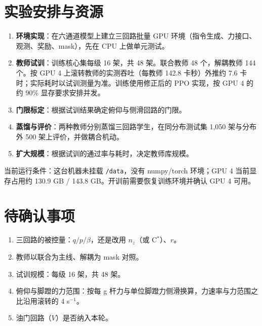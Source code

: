 \documentclass[UTF8,a4paper,11pt,fontset=fandol,scheme=plain]{ctexart}
\begin{document}
\section{实验安排与资源}
\label{sec:schedule}
\begin{enumerate}[leftmargin=1.8em]
\item \textbf{环境实现}：在六通道模型上建立三回路批量 GPU 环境（指令生成、力接口、观测、奖励、mask），先在 CPU 上做单元测试。
\item \textbf{教师试训}：训练核心集每级 16 架，共 48 架。联合教师 48 个，解耦教师 144 个。按 GPU 4 上滚转教师的实测吞吐（每教师 142.8 卡秒）外推约 7.6 卡时；实际耗时以试训测量为准。训练使用修正后的 PPO 实现，按 GPU 4 的约 90\% 显存要求安排并发。
\item \textbf{门限标定}：根据试训结果确定俯仰与侧滑回路的门限。
\item \textbf{蒸馏与评价}：两种教师分别蒸馏三回路学生，在同分布测试集 1,050 架与分布外 500 架上评价，并做耦合机动。
\item \textbf{扩大规模}：根据试训的通过率与耗时，决定教师库规模。
\end{enumerate}
当前运行条件：这台机器未挂载 \texttt{/data}，没有 numpy/torch 环境；GPU 4 当前显存占用约 130.9 GB / 143.8 GB。开训前需要恢复训练环境并确认 GPU 4 可用。

\section{待确认事项}
\begin{enumerate}[leftmargin=1.8em]
\item 三回路的被控量：\(q/p/\beta\)，还是改用 \(n_z\)（或 C\(^*\)）、\(r\)。
\item 教师以联合为主线、解耦为 mask 对照。
\item 试训规模：每级 16 架，共 48 架。
\item 俯仰与脚蹬的力范围：按每 g 杆力与单位脚蹬力侧滑换算，力速率与力范围之比沿用滚转的 4 s\(^{-1}\)。
\item 油门回路（\(V\)）是否纳入本轮。
\end{enumerate}
\end{document}
